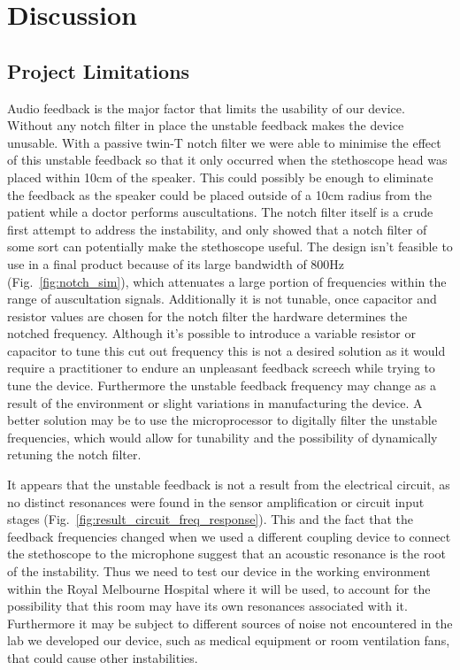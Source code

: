 \chapter{Discussion} \label{discussion}


\section{Project Limitations}

Audio feedback is the major factor that limits the usability of our device. Without any notch filter in place the unstable feedback makes the device unusable. With a passive twin-T notch filter we were able to minimise the effect of this unstable feedback so that it only occurred when the stethoscope head was placed within 10cm of the speaker. This could possibly be enough to eliminate the feedback as the speaker could be placed outside of a 10cm radius from the patient while a doctor performs auscultations. The notch filter itself is a crude first attempt to address the instability, and only showed that a notch filter of some sort can potentially make the stethoscope useful. The design isn't feasible to use in a final product because of its large bandwidth of 800Hz (Fig.~\ref{fig:notch_sim}), which attenuates a large portion of frequencies within the range of auscultation signals. Additionally it is not tunable, once capacitor and resistor values are chosen for the notch filter the hardware determines the notched frequency. Although it's possible to introduce a variable resistor or capacitor to tune this cut out frequency this is not a desired solution as it would require a practitioner to endure an unpleasant feedback screech while trying to tune the device. Furthermore the unstable feedback frequency may change as a result of the environment or slight variations in manufacturing the device. A better solution may be to use the microprocessor to digitally filter the unstable frequencies, which would allow for tunability and the possibility of dynamically retuning the notch filter.

It appears that the unstable feedback is not a result from the electrical circuit, as no distinct resonances were found in the sensor amplification or circuit input stages (Fig.~\ref{fig:result_circuit_freq_response}). This and the fact that the feedback frequencies changed when we used a different coupling device to connect the stethoscope to the microphone suggest that an acoustic resonance is the root of the instability. Thus we need to test our  device in the working environment within the Royal Melbourne Hospital where it will be used, to account for the possibility that this room may have its own resonances associated with it. Furthermore it may be subject to different sources of noise not encountered in the lab we developed our device, such as medical equipment or room ventilation fans, that could cause other instabilities.

